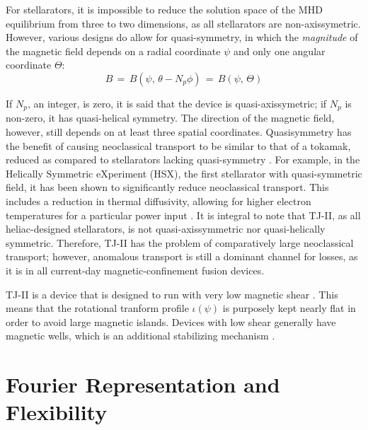 \documentclass[a4paper]{article}
\begin{document}
For stellarators, it is impossible to reduce the solution space of the MHD equilibrium from three to two dimensions, as all stellarators are non-axissymetric.
However, various designs do allow for quasi-symmetry, in which the \emph{magnitude} of the magnetic field depends on a radial coordinate $\psi$ and only one angular coordinate $\Theta$:
\begin{equation}
	B \,=\, B(\psi,\,\theta - N_p\phi) \,=\, B(\psi,\,\Theta)
\end{equation}

If $N_p$, an integer, is zero, it is said that the device is quasi-axissymetric; if $N_p$ is non-zero, it has quasi-helical symmetry.
The direction of the magnetic field, however, still depends on at least three spatial coordinates.
Quasisymmetry has the benefit of causing neoclassical transport to be similar to that of a tokamak, reduced as compared to stellarators lacking quasi-symmetry \cite{boozer_what_1998}.
For example, in the Helically Symmetric eXperiment (HSX), the first stellarator with quasi-symmetric field, it has been shown to significantly reduce neoclassical transport.
This includes a reduction in thermal diffusivity, allowing for higher electron temperatures for a particular power input \cite{talmadge_experimental_2008}.
It is integral to note that TJ-II, as all heliac-designed stellarators, is not quasi-axissymmetric nor quasi-helically symmetric.
Therefore, TJ-II has the problem of comparatively large neoclassical transport; however, anomalous transport is still a dominant channel for losses, as it is in all current-day magnetic-confinement fusion devices.

TJ-II is a device that is designed to run with very low magnetic shear \cite{milligen_mhd_2012}.
This means that the rotational tranform profile $\iota(\psi)$ is purposely kept nearly flat in order to avoid large magnetic islands.
Devices with low shear generally have magnetic wells, which is an additional stabilizing mechanism \cite{aguilera_magnetic_2015}.


\section*{Fourier Representation and Flexibility}
\end{document}
